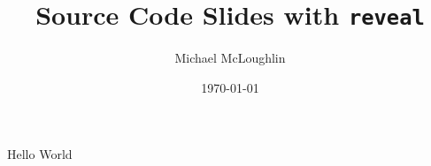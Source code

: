 \documentclass[aspectratio=169,14pt]{beamer}
\title{Source Code Slides with \texttt{reveal}}
\date{\today}
\author{Michael McLoughlin}
\begin{document}
\maketitle

\begin{frame}{Hello World}


\end{frame}
\end{document}
